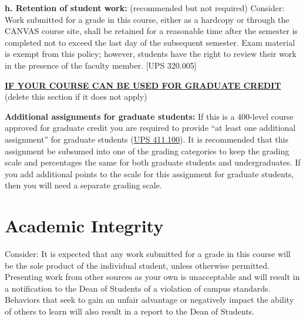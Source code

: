 \documentclass[12pt]{article} %
\begin{document}
\vspace{1em}

\noindent \textbf{h. Retention of student work:} {\color{annotationblue}(recommended but not required)} {\color{suggestionred}Consider: Work submitted for a grade in this course, either as a hardcopy or through the CANVAS course site, shall be retained for a reasonable time after the semester is completed not to exceed the last day of the subsequent semester. Exam material is exempt from this policy; however, students have the right to review their work in the presence of the faculty member. [UPS 320.005]}

\vspace{1em}

\noindent \textbf{\underline{IF YOUR COURSE CAN BE USED FOR GRADUATE CREDIT}} {\color{annotationblue}(delete this section if it does not apply)}

\vspace{0.5em}

\noindent \textbf{Additional assignments for graduate students:} {\color{annotationblue}If this is a 400-level course approved for graduate credit you are required to provide ``at least one additional assignment'' for graduate students (\href{https://www.fullerton.edu/senate/publications_policies_resolutions/ups/UPS\%20400/UPS\%20411.100.pdf}{UPS 411.100}). It is recommended that this assignment be subsumed into one of the grading categories to keep the grading scale and percentages the same for both graduate students and undergraduates. If you add additional points to the scale for this assignment for graduate students, then you will need a separate grading scale.}

\section*{Academic Integrity}

 {\color{suggestionred}Consider: It is expected that any work submitted for a grade in this course will be the sole product of the individual student, unless otherwise permitted. Presenting work from other sources as your own is unacceptable and will result in a notification to the Dean of Students of a violation of campus standards. Behaviors that seek to gain an unfair advantage or negatively impact the ability of others to learn will also result in a report to the Dean of Students.}
\end{document}
